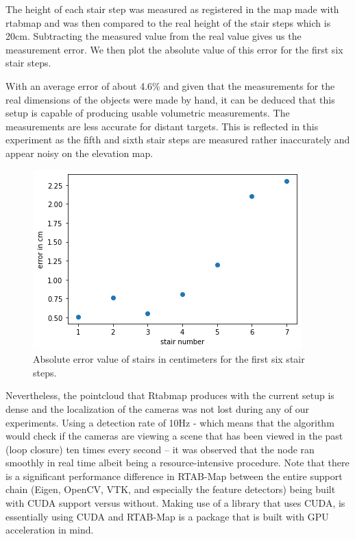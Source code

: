 \documentclass{article}
\begin{document}
\clearpage
\bigskip
\bigskip
\bigskip
\bigskip


The height of each stair step was measured as registered in the map made with rtabmap and was then compared to the real height of the stair steps which is 20cm. Subtracting the measured value from the real value gives us the measurement error. We then plot the absolute value of this error for the first six stair steps.

With an average error of about 4.6\% and given that the measurements for the real dimensions of the objects were made by hand, it can be deduced that this setup is capable of producing usable volumetric measurements. The measurements are less accurate for distant targets. This is reflected in this experiment as the fifth and sixth stair steps are measured rather inaccurately and appear noisy on the elevation map. 

\begin{figure}[h] %
    \centering
	\includegraphics[width=\textwidth,height=\textheight,keepaspectratio]{report1-img014.png} %
	\caption{Absolute error value of stairs in centimeters for the first six stair steps. }
\end{figure}

\clearpage

Nevertheless, the pointcloud that Rtabmap produces with the current setup is dense and the localization of the cameras was not lost during any of our experiments. Using a detection rate of 10Hz - which means that the algorithm would check if the cameras are viewing a scene that has been viewed in the past (loop closure) ten times every second – it was observed that the node ran smoothly in real time albeit being a resource-intensive procedure. Note that there is a significant performance difference in RTAB-Map between the entire support chain (Eigen, OpenCV, VTK, and especially the feature detectors) being built with CUDA support versus without. Making use of a library that uses CUDA, is essentially using CUDA and  RTAB-Map is a package that is built with GPU acceleration in mind.
\end{document}

